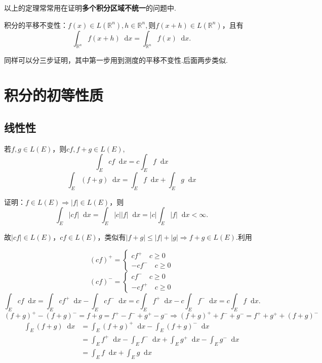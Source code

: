 \documentclass[bwprint, withoutpreface]{cumcmthesis}
\newcommand*{\dif}{\mathop{}\!\mathrm{d}}
\begin{document}
以上的定理常常用在证明\textbf{多个积分区域不统一}的问题中.

积分的平移不变性：$f(x) \in L(\mathbb{R}^n), h \in \mathbb{R}^n, \mbox{则} f(x + h) \in L(\mathbb{R}^n)$，且有
\begin{equation*}
	\int_{\mathbb{R}^n} f(x + h) \dif x = \int_{\mathbb{R}^n} f(x) \dif x.
\end{equation*}

同样可以分三步证明，其中第一步用到测度的平移不变性.后面两步类似.

\section{积分的初等性质}
\subsection{线性性}
若$f,g \in L(E)$，则$cf, f + g \in L(E)$,
\begin{equation*}
	\int_E cf \dif x = c \int_E f \dif x
\end{equation*}
\begin{equation*}
	\int_E (f + g) \dif x = \int_E f \dif x + \int_E g \dif x
\end{equation*}

证明：$f \in L(E) \Rightarrow |f| \in L(E)$，则\[ \int_E |cf| \dif x = \int_E |c||f| \dif x = |c| \int_E |f| \dif x < \infty. \]

故$|cf| \in L(E)$，$cf \in L(E)$，类似有$|f + g| \leqslant |f| + |g| \Rightarrow f + g \in L(E).$利用

\begin{equation*}
	(cf)^+ =
	\begin{cases}
		cf^+ \quad c \geqslant 0 \\
		-cf^- \quad c \geqslant 0
	\end{cases}
\end{equation*}
\begin{equation*}
	(cf)^- =
	\begin{cases}
		cf^- \quad c \geqslant 0 \\
		-cf^+ \quad c \geqslant 0
	\end{cases}
\end{equation*}
\begin{equation*}
	\int_E cf \dif x = \int_E cf^+ \dif x - \int_E cf^- \dif x = c \int_E f^+ \dif x - c \int_E f^- \dif x = c \int_E f \dif x.
\end{equation*}
\begin{equation*}
	(f + g)^+ - (f + g)^- = f + g = f^+ - f^- + g^+ - g^- \Rightarrow (f + g)^+ + f^- + g^- = f^+ + g^+ + (f + g)^-
\end{equation*}
\begin{align*}
	\int_E (f + g) \dif x & = \int_E (f + g)^+ \dif x - \int_E (f + g)^- \dif x \\
						  & = \int_E f^+ \dif x - \int_E f^- \dif x + \int_E g^+ \dif x - \int_E g^- \dif x \\  
						  & = \int_E f \dif x + \int_E g \dif x
\end{align*}
\end{document}
